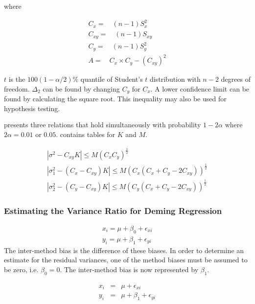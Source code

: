 \documentclass[12pt, a4paper]{report}
\theoremstyle{plain}
\theoremstyle{definition}
\theoremstyle{remark}
\begin{document}
	
	where
	
	\begin{eqnarray}
	C_{x}=\quad(n-1)S^2_{x}\nonumber\\
	C_{xy}=\quad(n-1)S_{xy}\nonumber\\
	C_{y}=\quad(n-1)S^2_{y}\nonumber\\
	A=\quad C_{x}\times C_{y} - (C_{xy})^2 \nonumber
	\end{eqnarray}
	
	$t$ is the $100(1-\alpha/2)\%$ quantile of Student's $t$
	distribution with $n-2$ degrees of freedom. $\Delta_{2}$ can be
	found by changing $C_{y}$ for $C_{x}$. A lower confidence limit
	can be found by calculating the square root. This inequality may
	also be used for hypothesis testing.
	
	\citet{Thompson} presents three relations that hold simultaneously
	with probability $1-2\alpha$ where $2\alpha=0.01$ or $0.05$. \citet{Thompson} contains tables for $K$ and $M$.
	
	\begin{eqnarray}
	|\sigma^2-C_{xy}K|\leqslant M(C_{x}C_{y})^{\frac{1}{2}}\\
	|\sigma^2_{1}-(C_{x}-C_{xy})K|\leqslant M(C_{x}(C_{x}+C_{y}-2C_{xy}))^{\frac{1}{2}}\nonumber\\
	|\sigma^2_{2}-(C_{y}-C_{xy})K|\leqslant
	M(C_{y}(C_{x}+C_{y}-2C_{xy}))^{\frac{1}{2}}\nonumber
	\end{eqnarray}	
	
	
	
	
	
	
	


\subsubsection{Estimating the Variance Ratio for Deming Regression}

\begin{eqnarray*}
	x_{i} = \mu +  \beta_{0} + \epsilon_{xi}\\
	y_{i} = \mu +  \beta_{1} + \epsilon_{yi}
\end{eqnarray*}
The inter-method bias is the difference of these biases. In order to determine an estimate for the residual variances, one of the method biases must be assumed to be zero, i.e. $\beta_{0} = 0$. The inter-method bias is now represented by $\beta_{1}$.

\begin{eqnarray*}
	x_{i} &=& \mu + \epsilon_{xi}\\
	y_{i} &=& \mu +  \beta_{1} + \epsilon_{yi}
\end{eqnarray*}
\end{document}
